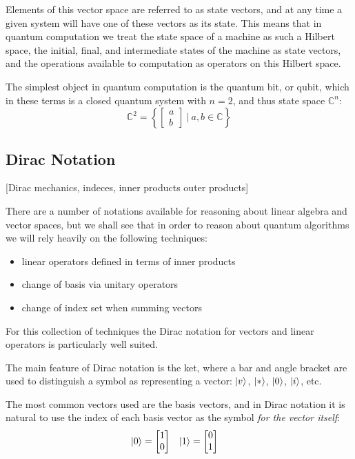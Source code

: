 Elements of this vector space are referred to as state vectors, and at any time a given system will have one of these vectors as its state. This means that in quantum computation we treat the state space of a machine as such a Hilbert space, the initial, final, and intermediate states of the machine as state vectors, and the operations available to computation as operators on this Hilbert space.

The simplest object in quantum computation is the quantum bit, or qubit, which in these terms is a closed quantum system with $n=2$, and thus state space $\mathbb{C}^n$:
\[
\mathbb{C}^2 = \left\{\left[\begin{matrix}
a\\
b
\end{matrix}\right]\ \bigg|\ a, b \in \mathbb{C}\right\}
\]
\subsection{Dirac Notation}
[Dirac mechanics, indeces, inner products outer products]

There are a number of notations available for reasoning about linear algebra and vector spaces, but we shall see that in order to reason about quantum algorithms we will rely heavily on the following techniques:
\begin{itemize}
	\item linear operators defined in terms of inner products
	\item change of basis via unitary operators
	\item change of index set when summing vectors
\end{itemize}
For this collection of techniques the Dirac notation for vectors and linear operators is particularly well suited.

The main feature of Dirac notation is the ket, where a bar and angle bracket are used to distinguish a symbol as representing a vector: $| v \rangle$, $| * \rangle$, $| 0 \rangle$, $| i \rangle$, etc.

The most common vectors used are the basis vectors, and in Dirac notation it is natural to use the index of each basis vector as the symbol \textit{for the vector itself}:
\begin{align*}
| 0 \rangle = \left[\begin{matrix}
1\\
0
\end{matrix}\right]
&&&
| 1 \rangle = \left[\begin{matrix}
0\\
1
\end{matrix}\right]
\end{align*}

